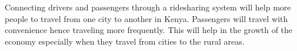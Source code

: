 Connecting drivers and passengers through a ridesharing system will help more people to travel from one city to another in Kenya. Passengers will travel with convenience hence traveling more frequently. This will help in the growth of the economy especially when they travel from cities to the rural areas.